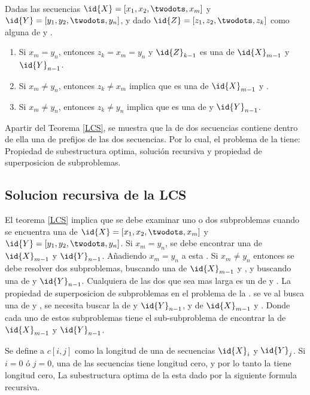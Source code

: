 \begin{theorem}\ \\
\label{LCS}
Dadas las secuencias $\id{X}=[x_1,x_2,\twodots,x_m]$ y $\id{Y}=[y_1,y_2,\twodots,y_n]$, y dado $\id{Z}=[z_1,z_2,\twodots,z_k]$ como alguna  de  y .
\begin{enumerate}
    \item Si $x_m = y_n$, entonces $z_k = x_m = y_n$ y $\id{Z}_{k-1}$ es una  de $\id{X}_{m-1}$ y $\id{Y}_{n-1}$.
    \item Si $x_m \neq y_n$, entonces $z_k \neq x_m$ implica que  es una  de $\id{X}_{m-1}$ y .
    \item Si $x_m \neq y_n$, entonces $z_k \neq y_n$ implica que  es una  de  y $\id{Y}_{n-1}$.
\end{enumerate}
\end{theorem}

Apartir del Teorema \ref{LCS}, se muestra que la  de dos secuencias contiene dentro de ella una  de prefijos de las dos secuencias. Por lo cual, el problema de la  tiene: Propiedad de subestructura optima, solución recursiva y propiedad de superposicion de subproblemas.

\subsection{Solucion recursiva de la LCS}
El teorema \ref{LCS} implica que se debe examinar uno o dos subproblemas cuando se encuentra una  de $\id{X} = [x_1,x_2,\twodots,x_m]$ y $\id{Y} = [y_1,y_2,\twodots,y_n]$. Si $x_m = y_n$, se debe encontrar una  de $\id{X}_{m-1}$ y $\id{Y}_{n-1}$. Añadiendo $x_m = y_n$ a esta . Si $x_m \neq y_n$ entonces se debe resolver dos subproblemas, buscando una  de $\id{X}_{m-1}$ y , y buscando una  de  y $\id{Y}_{n-1}$. Cualquiera de las dos  que sea mas larga es un  de  y .
La propiedad de superposicion de subproblemas en el problema de la . se ve al busca una  de  y , se necesita buscar la  de  y $\id{Y}_{n-1}$, y de $\id{X}_{m-1}$ y . Donde cada uno de estos subproblemas tiene el sub-subproblema de encontrar la  de $\id{X}_{m-1}$ y $\id{Y}_{n-1}$.

Se define a $c[i, j]$ como la longitud de una  de secuencias $\id{X}_{i}$ y $\id{Y}_{j}$. Si $i=0$ ó $j=0$, una de las secuencias tiene longitud cero, y por lo tanto la  tiene longitud cero, La subestructura optima de la  esta dado por la siguiente formula recursiva.

